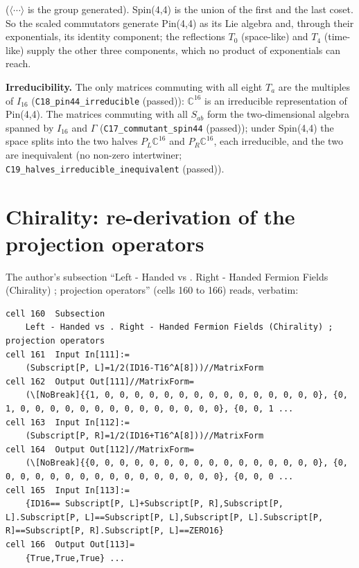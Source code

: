 \documentclass[
  10pt,
]{article}
\begin{document}
(\(\langle\cdots\rangle\) is the group generated). Spin(4,4) is the
union of the first and the last coset. So the scaled commutators
generate Pin(4,4) as its Lie algebra and, through their exponentials,
its identity component; the reflections \(T_0\) (space-like) and \(T_4\)
(time-like) supply the other three components, which no product of
exponentials can reach.

\textbf{Irreducibility.} The only matrices commuting with all eight
\(T_a\) are the multiples of \(I_{16}\)
(\texttt{C18\_pin44\_irreducible} (passed)): \(\mathbb C^{16}\) is an
irreducible representation of Pin(4,4). The matrices commuting with all
\(S_{ab}\) form the two-dimensional algebra spanned by \(I_{16}\) and
\(\Gamma\) (\texttt{C17\_commutant\_spin44} (passed)); under Spin(4,4)
the space splits into the two halves \(P_L\mathbb C^{16}\) and
\(P_R\mathbb C^{16}\), each irreducible, and the two are inequivalent
(no non-zero intertwiner;
\texttt{C19\_halves\_irreducible\_inequivalent} (passed)).

\hypertarget{chirality-re-derivation-of-the-projection-operators}{%
\section{Chirality: re-derivation of the projection
operators}\label{chirality-re-derivation-of-the-projection-operators}}

The author's subsection ``Left - Handed vs . Right - Handed Fermion
Fields (Chirality) ; projection operators'' (cells 160 to 166) reads,
verbatim:

\begin{verbatim}
cell 160  Subsection 
    Left - Handed vs . Right - Handed Fermion Fields (Chirality) ; projection operators
cell 161  Input In[111]:=
    (Subscript[P, L]=1/2(ID16-T16^A[8]))//MatrixForm
cell 162  Output Out[111]//MatrixForm=
    (\[NoBreak]{{1, 0, 0, 0, 0, 0, 0, 0, 0, 0, 0, 0, 0, 0, 0, 0}, {0, 1, 0, 0, 0, 0, 0, 0, 0, 0, 0, 0, 0, 0, 0, 0}, {0, 0, 1 ...
cell 163  Input In[112]:=
    (Subscript[P, R]=1/2(ID16+T16^A[8]))//MatrixForm
cell 164  Output Out[112]//MatrixForm=
    (\[NoBreak]{{0, 0, 0, 0, 0, 0, 0, 0, 0, 0, 0, 0, 0, 0, 0, 0}, {0, 0, 0, 0, 0, 0, 0, 0, 0, 0, 0, 0, 0, 0, 0, 0}, {0, 0, 0 ...
cell 165  Input In[113]:=
    {ID16== Subscript[P, L]+Subscript[P, R],Subscript[P, L].Subscript[P, L]==Subscript[P, L],Subscript[P, L].Subscript[P, R]==Subscript[P, R].Subscript[P, L]==ZERO16}
cell 166  Output Out[113]=
    {True,True,True} ...
\end{verbatim}
\end{document}
